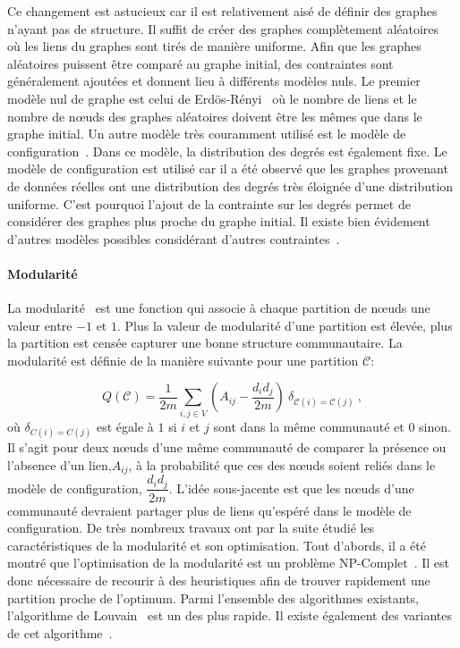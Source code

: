 Ce changement est astucieux car il est relativement aisé de définir des graphes n'ayant pas de structure.
Il suffit de créer des graphes complètement aléatoires~\cite{Erdos1959} où les liens du graphes sont tirés de manière uniforme.
Afin que les graphes aléatoires puissent être comparé au graphe initial, des contraintes sont généralement ajoutées et donnent lieu à différents modèles nuls.
Le premier modèle nul de graphe est celui de Erdös-Rényi~\cite{Erdos1959} où le nombre de liens et le nombre de n\oe uds des graphes aléatoires doivent être les mêmes que dans le graphe initial.
Un autre modèle très couramment utilisé est le modèle de configuration~\cite{Bender1978a}.
Dans ce modèle, la distribution des degrés est également fixe.
Le modèle de configuration est utilisé car il a été observé que les graphes provenant de données réelles ont une distribution des degrés très éloignée d'une distribution uniforme.
C'est pourquoi l'ajout de la contrainte sur les degrés permet de considérer des graphes plus proche du graphe initial. 
Il existe bien évidement d'autres modèles possibles considérant d'autres contraintes~\cite{Newman2009}.

\paragraph{Modularité}
La modularité~\cite{Newman2004} est une fonction qui associe à chaque partition de n\oe uds une valeur entre $-1$ et $1$.
Plus la valeur de modularité d'une partition est élevée, plus la partition est censée capturer une bonne structure communautaire.
La modularité est définie de la manière suivante pour une partition $\mathcal{C}$:

\begin{equation}
Q(\mathcal{C}) = \dfrac{1}{2m}\sum_{i,j \in V} \left(A_{ij} - \dfrac{d_id_j}{2m}\right)\ \delta_{\mathcal{C}(i)=\mathcal{C}(j)} \ ,
\end{equation}
où $\delta_{C(i)=C(j)}$ est égale à $1$ si $i$ et $j$ sont dans la même communauté et $0$ sinon.
Il s'agit pour deux n\oe uds d'une même communauté de comparer la présence ou l'absence d'un lien,$A_{ij}$, à la probabilité que ces des n\oe uds soient reliés dans le modèle de configuration, $\dfrac{d_id_j}{2m}$.
L'idée sous-jacente est que les n\oe uds d'une communauté devraient partager plus de liens qu'espéré dans le modèle de configuration.
De très nombreux travaux ont par la suite étudié les caractéristiques de la modularité et son optimisation.
Tout d'abords, il a été montré que l'optimisation de la modularité est un problème NP-Complet~\cite{Brandes2007}.
Il est donc nécessaire de recourir à des heuristiques afin de trouver rapidement une partition proche de l'optimum.
Parmi l'ensemble des algorithmes existants, l'algorithme de Louvain~\cite{Blondel2008a} est un des plus rapide.
Il existe également des variantes de cet algorithme~\cite{Huang2015,Traag2015a}.

